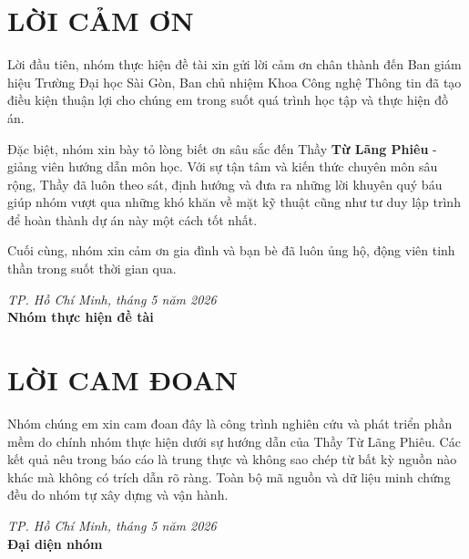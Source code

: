 \documentclass[a4paper]{article}
\begin{document}
\newpage
\thispagestyle{empty}
\section*{LỜI CẢM ƠN}
Lời đầu tiên, nhóm thực hiện đề tài xin gửi lời cảm ơn chân thành đến Ban giám hiệu Trường Đại học Sài Gòn, Ban chủ nhiệm Khoa Công nghệ Thông tin đã tạo điều kiện thuận lợi cho chúng em trong suốt quá trình học tập và thực hiện đồ án.

Đặc biệt, nhóm xin bày tỏ lòng biết ơn sâu sắc đến Thầy \textbf{Từ Lãng Phiêu} - giảng viên hướng dẫn môn học. Với sự tận tâm và kiến thức chuyên môn sâu rộng, Thầy đã luôn theo sát, định hướng và đưa ra những lời khuyên quý báu giúp nhóm vượt qua những khó khăn về mặt kỹ thuật cũng như tư duy lập trình để hoàn thành dự án này một cách tốt nhất.

Cuối cùng, nhóm xin cảm ơn gia đình và bạn bè đã luôn ủng hộ, động viên tinh thần trong suốt thời gian qua.

\vspace{1cm}
\begin{flushright}
    \textit{TP. Hồ Chí Minh, tháng 5 năm 2026} \\
    \textbf{Nhóm thực hiện đề tài}
\end{flushright}

\newpage
\thispagestyle{empty}
\section*{LỜI CAM ĐOAN}
Nhóm chúng em xin cam đoan đây là công trình nghiên cứu và phát triển phần mềm do chính nhóm thực hiện dưới sự hướng dẫn của Thầy Từ Lãng Phiêu. Các kết quả nêu trong báo cáo là trung thực và không sao chép từ bất kỳ nguồn nào khác mà không có trích dẫn rõ ràng. Toàn bộ mã nguồn và dữ liệu minh chứng đều do nhóm tự xây dựng và vận hành.

\vspace{1cm}
\begin{flushright}
    \textit{TP. Hồ Chí Minh, tháng 5 năm 2026} \\
    \textbf{Đại diện nhóm}
\end{flushright}

\newpage
\thispagestyle{empty}
\tableofcontents

\newpage
\listoffigures

\newpage
\listoftables

\newpage
\end{document}
